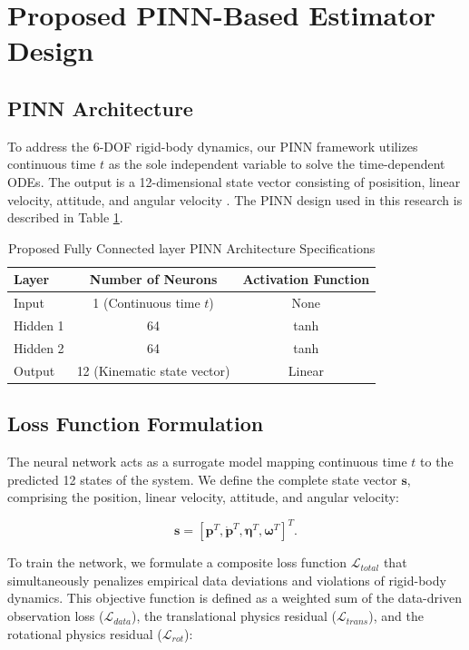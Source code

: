 \section{Proposed PINN-Based Estimator Design}

\subsection{PINN Architecture}
To address the 6-DOF rigid-body dynamics, our PINN framework utilizes continuous time $t$ as the sole independent variable to solve the time-dependent ODEs. The output is a 12-dimensional state vector consisting of posisition, linear velocity, attitude, and angular velocity \cite{lakshminarayana_application_2022, mojgani_kolmogorov_2023, raissi_physics-informed_2019}. The PINN design used in this research is described in Table \ref{tab:pinn_architecture}.

\begin{table}[htbp]
\caption{Proposed Fully Connected layer PINN Architecture Specifications}
\label{tab:pinn_architecture}
\centering
\begin{tabular}{lcc}
\hline
\textbf{Layer} & \textbf{Number of Neurons} & \textbf{Activation Function} \\
\hline
Input & 1 (Continuous time $t$) & None \\
Hidden 1 & 64 & tanh \\
Hidden 2 & 64 & tanh \\
Output & 12 (Kinematic state vector) & Linear \\
\hline
\end{tabular}
\end{table}

\subsection{Loss Function Formulation}

The neural network acts as a surrogate model mapping continuous time $t$ to the predicted 12 states of the system. We define the complete state vector $\mathbf{s}$, comprising the position, linear velocity, attitude, and angular velocity:

\begin{equation}
    \mathbf{s} = [\mathbf{p}^T, \mathbf{\dot{p}}^T, \boldsymbol{\eta}^T, \boldsymbol{\omega}^T]^T \label{eq:body_state}.
\end{equation}

To train the network, we formulate a composite loss function $\mathcal{L}_{total}$ \cite{serrano_physics-informed_2024, raissi_physics-informed_2019} that simultaneously penalizes empirical data deviations and violations of rigid-body dynamics. This objective function is defined as a weighted sum of the data-driven observation loss ($\mathcal{L}_{data}$), the translational physics residual ($\mathcal{L}_{trans}$), and the rotational physics residual ($\mathcal{L}_{rot}$):

